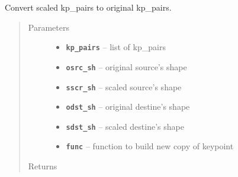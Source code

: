 \documentclass[letterpaper,10pt,english]{sphinxmanual}
\begin{document}
\begin{fulllineitems}
\label{RRtoolbox.lib.arrayops:RRtoolbox.lib.arrayops.convert.spairs2opairs}
Convert scaled kp\_pairs to original kp\_pairs.
\begin{quote}\begin{description}
\item[{Parameters}] \leavevmode\begin{itemize}
\item {} 
\textbf{\texttt{kp\_pairs}} -- list of kp\_pairs

\item {} 
\textbf{\texttt{osrc\_sh}} -- original source's shape

\item {} 
\textbf{\texttt{sscr\_sh}} -- scaled source's shape

\item {} 
\textbf{\texttt{odst\_sh}} -- original destine's shape

\item {} 
\textbf{\texttt{sdst\_sh}} -- scaled destine's shape

\item {} 
\textbf{\texttt{func}} -- function to build new copy of keypoint

\end{itemize}

\item[{Returns}] \leavevmode


\end{description}\end{quote}

\end{fulllineitems}

\end{document}
